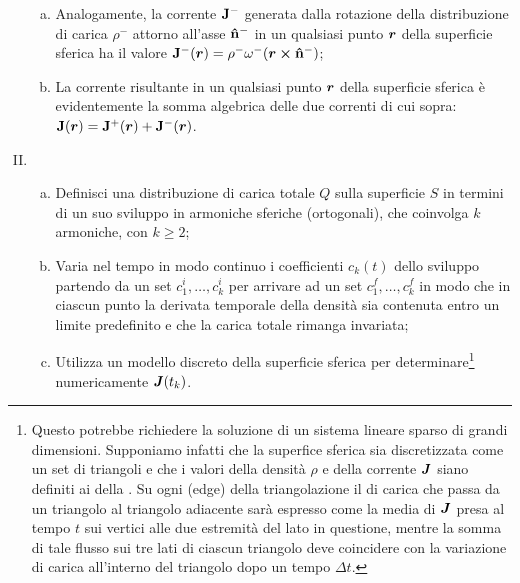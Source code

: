 \begin{enumerate}[(I)]
\begin{enumerate}[(a)]
	\item Analogamente, la corrente  $\vb{J}^-$ generata dalla rotazione della distribuzione di carica $\rho^-$ attorno all'asse $\vu{n}^-$ in un qualsiasi punto $\vb*{r}$ della superficie sferica ha il valore $\vb{J}^-(\vb*{r}) = \rho^- \omega^- (\vb*{r} \cross \vu{n}^-)$;
	\item La corrente risultante in un qualsiasi punto $\vb*{r}$ della superficie sferica è evidentemente la somma algebrica delle due correnti di cui sopra: $\vb{J}(\vb*{r}) = \vb{J}^+(\vb*{r}) + \vb{J}^-(\vb*{r})$.
	\end{enumerate}
\item {} 
	\begin{enumerate}[(a)]
	\item Definisci una distribuzione di carica totale $Q$ sulla superficie $S$ in termini di un  suo sviluppo in armoniche sferiche (ortogonali), che coinvolga $k$ armoniche, con $k \geq 2$;  
	\item Varia nel tempo in modo continuo i coefficienti $c_k(t)$ dello sviluppo partendo da un set  $c^{i}_1, \ldots, c^{i}_k$ per arrivare ad un set  $c^{f}_1, \ldots, c^{f}_k$ in modo che in ciascun punto la derivata temporale della densità sia contenuta entro un limite predefinito e che la carica totale rimanga invariata;
	\item Utilizza un modello discreto della superficie sferica per determinare\footnote{Questo potrebbe richiedere la soluzione di un sistema lineare sparso di grandi dimensioni. Supponiamo infatti che la superfice sferica sia discretizzata come un set di triangoli e che i valori della densità $\rho$ e della corrente $\vb*{J}$ siano definiti ai  della . Su ogni  (edge) della triangolazione il  di carica che passa da un triangolo al triangolo adiacente sarà espresso come la media di $\vb*{J}$ presa al tempo $t$ sui vertici alle due estremità del lato in questione, mentre la somma di tale flusso sui tre lati di ciascun triangolo deve coincidere con la variazione di carica all'interno del triangolo dopo un tempo $\Delta t$.} numericamente $\vb*{J}(t_k)$.
	\end{enumerate}
\end{enumerate}

